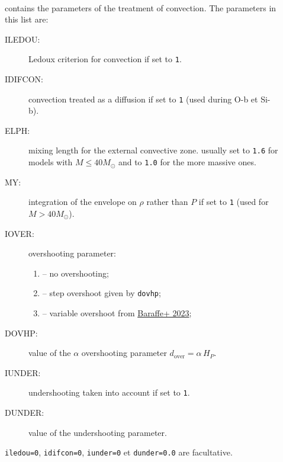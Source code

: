\documentclass[11pt]{article}
\def\msol{\ensuremath{M_\odot}}
\begin{document}
\begin{description}
  \item[] ~\\ contains the parameters of the treatment of convection. The parameters in this list are:
    \begin{description}
      \item[ILEDOU:] Ledoux criterion for convection if set to \texttt{1}.
      \item[IDIFCON:] convection treated as a diffusion if set to \texttt{1} (used during O-b et Si-b).
      \item[ELPH:] mixing length for the external convective zone. usually set to {\tt 1.6} for models with $M \le 40 \msol$ and to {\tt 1.0} for the more massive ones.
      \item[MY:] integration of the envelope on $\rho$ rather than $P$ if set to \texttt{1} (used for $M > 40 \msol$).
      \item[IOVER:] overshooting parameter:
        \begin{enumerate}[labelindent=.5cm,font=\ttfamily \bfseries,label=\arabic*]
          \item[0] -- no overshooting;
          \item[1] -- step overshoot given by \texttt{dovhp};
          \item[2] -- variable overshoot from \href{https://ui.adsabs.harvard.edu/abs/2023MNRAS.519.5333B}{Baraffe+ 2023};
        \end{enumerate}
      \item[DOVHP:] value of the $\alpha$ overshooting parameter $d_\text{over}=\alpha\, H_P$.
      \item[IUNDER:] undershooting taken into account if set to \texttt{1}.
      \item[DUNDER:] value of the undershooting  parameter.
    \end{description}
    \texttt{iledou=0}, \texttt{idifcon=0}, \texttt{iunder=0} et \texttt{dunder=0.0} are facultative.\\


\end{description}
\end{document}
